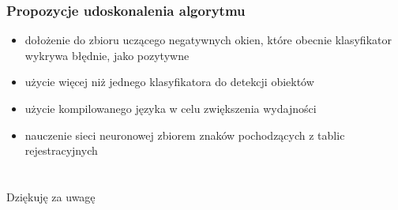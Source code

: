 \documentclass{beamer}
\begin{document}
    \begin{frame}
        \frametitle{Propozycje udoskonalenia algorytmu}
        \begin{itemize}
            \item dołożenie do zbioru uczącego negatywnych okien, które obecnie klasyfikator wykrywa błędnie, jako pozytywne
            \item użycie więcej niż jednego klasyfikatora do detekcji obiektów
            \item użycie kompilowanego języka w celu zwiększenia wydajności
            \item nauczenie sieci neuronowej zbiorem znaków pochodzących \linebreak z tablic rejestracyjnych
        \end{itemize}

%
    \end{frame}


    \section{}
    \begin{frame}
        \begin{center}
        {\Huge Dziękuję za uwagę}
        \end{center}
    \end{frame}
\end{document}
